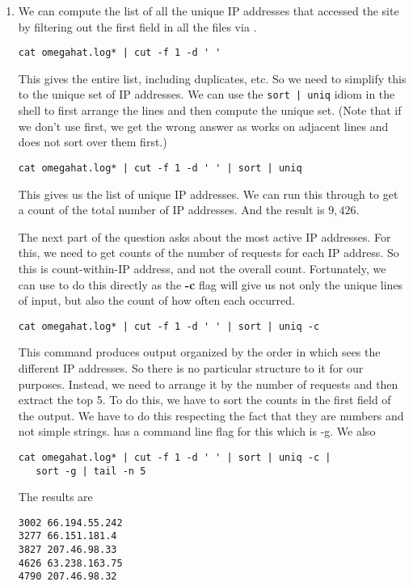 \begin{enumerate}
\item %
We can compute the list of all the unique IP addresses that accessed the site
by filtering out the first field in all the files via .
\begin{verbatim}
cat omegahat.log* | cut -f 1 -d ' '
\end{verbatim}
This gives the entire list, including
duplicates, etc.
So we need to simplify this to the unique set of IP addresses.
We can use the \verb+sort | uniq+ idiom in the shell to 
first arrange the lines and then compute the unique set.
(Note that if we don't use  first, we get the wrong
answer as  works on adjacent lines and does not sort
over them first.)
\begin{verbatim}
cat omegahat.log* | cut -f 1 -d ' ' | sort | uniq 
\end{verbatim}
This gives us the list of unique IP addresses.
We can run this through  to get a count
of the total number of IP addresses.
And the result is $9,426$.

The next part of the question asks about the most active IP addresses.
For this, we need to get counts of the number of requests for each IP address.
So this is count-within-IP  address, and not the overall count.
Fortunately,  we can use  to do this directly
as the \textbf{-c} flag will give us not only the 
unique lines of input, but also the count of how often each occurred.
\begin{verbatim}
cat omegahat.log* | cut -f 1 -d ' ' | sort | uniq -c
\end{verbatim}

This command produces output organized by the order in which 
 sees the different IP addresses.
So there is no particular structure to it for our purposes.
Instead, we need to arrange it by the number of requests
and then extract the top 5.
To do this, we have to sort the counts in the first field of the output.
We have to do this respecting the fact that they are numbers and not simple
strings.
 has a command line flag for this which is -g.
We also
\begin{verbatim}
cat omegahat.log* | cut -f 1 -d ' ' | sort | uniq -c | 
   sort -g | tail -n 5
\end{verbatim}
The results are
\begin{verbatim}
3002 66.194.55.242
3277 66.151.181.4
3827 207.46.98.33
4626 63.238.163.75
4790 207.46.98.32
\end{verbatim}


\end{enumerate}
